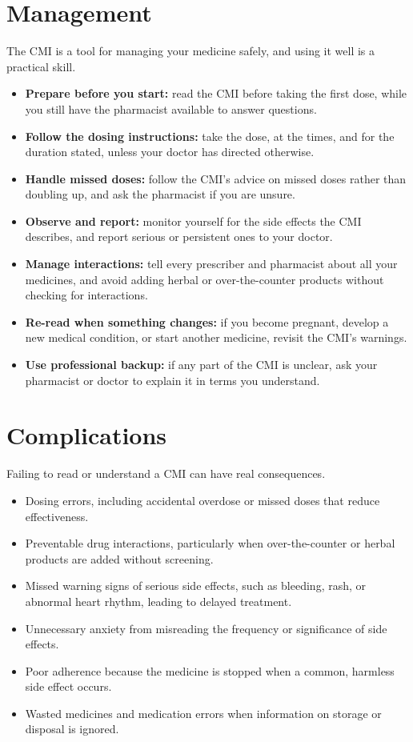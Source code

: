\section*{Management}
The CMI is a tool for managing your medicine safely, and using it well is a practical skill.
\begin{itemize}
    \item \textbf{Prepare before you start:} read the CMI before taking the first dose, while you still have the pharmacist available to answer questions.
    \item \textbf{Follow the dosing instructions:} take the dose, at the times, and for the duration stated, unless your doctor has directed otherwise.
    \item \textbf{Handle missed doses:} follow the CMI's advice on missed doses rather than doubling up, and ask the pharmacist if you are unsure.
    \item \textbf{Observe and report:} monitor yourself for the side effects the CMI describes, and report serious or persistent ones to your doctor.
    \item \textbf{Manage interactions:} tell every prescriber and pharmacist about all your medicines, and avoid adding herbal or over-the-counter products without checking for interactions.
    \item \textbf{Re-read when something changes:} if you become pregnant, develop a new medical condition, or start another medicine, revisit the CMI's warnings.
    \item \textbf{Use professional backup:} if any part of the CMI is unclear, ask your pharmacist or doctor to explain it in terms you understand.
\end{itemize}

\section*{Complications}
Failing to read or understand a CMI can have real consequences.
\begin{itemize}
    \item Dosing errors, including accidental overdose or missed doses that reduce effectiveness.
    \item Preventable drug interactions, particularly when over-the-counter or herbal products are added without screening.
    \item Missed warning signs of serious side effects, such as bleeding, rash, or abnormal heart rhythm, leading to delayed treatment.
    \item Unnecessary anxiety from misreading the frequency or significance of side effects.
    \item Poor adherence because the medicine is stopped when a common, harmless side effect occurs.
    \item Wasted medicines and medication errors when information on storage or disposal is ignored.
\end{itemize}

